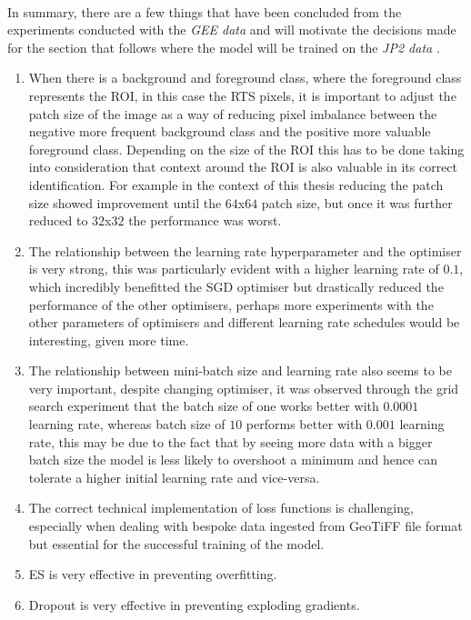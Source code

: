 \paragraph{}
In summary, there are a few things that have been concluded from the experiments conducted with the \textit{\gls{GEE} data} and will motivate the decisions made for the section that follows where the model will be trained on the \textit{\gls{JP2} data} .
\begin{enumerate}
    \item{When there is a background and foreground class, where the foreground class represents the \gls{ROI}, in this case the \gls{RTS} pixels, it is important to adjust the patch size of the image as a way of reducing pixel imbalance between the negative more frequent background class and the positive more valuable foreground class. Depending on the size of the \gls{ROI} this has to be done taking into consideration that context around the \gls{ROI} is also valuable in its correct identification. For example in the context of this thesis reducing the patch size showed improvement until the $64$x$64$ patch size, but once it was further reduced to $32$x$32$ the performance was worst.}
    \item{The relationship between the learning rate hyperparameter and the optimiser is very strong, this was particularly evident with a higher learning rate of $0.1$, which incredibly benefitted the \gls{SGD} optimiser but drastically reduced the performance of the other optimisers, perhaps more experiments with the other parameters of optimisers and different learning rate schedules would be interesting, given more time.}
    \item{The relationship between mini-batch size and learning rate also seems to be very important, despite changing optimiser, it was observed through the grid search experiment that the batch size of one works better with $0.0001$ learning rate, whereas batch size of $10$ performs better with $0.001$ learning rate, this may be due to the fact that by seeing more data with a bigger batch size the model is less likely to overshoot a minimum and hence can tolerate a higher initial learning rate and vice-versa.}
    \item {The correct technical implementation of loss functions is challenging, especially when dealing with bespoke data ingested from GeoTiFF file format but essential for the successful training of the model.}
    \item {\gls{ES} is very effective in preventing overfitting.}
    \item {Dropout is very effective in preventing exploding gradients.}
\end{enumerate}

